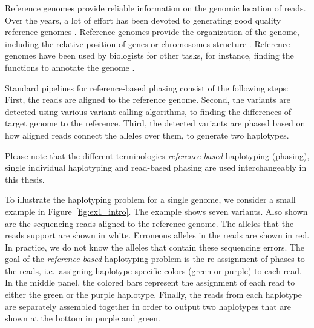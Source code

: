 Reference genomes provide reliable information on the genomic location of reads. 
Over the years, a lot of effort has been devoted to generating good quality reference genomes \citep{10002010map, international2005haplotype}.
 Reference genomes provide the organization of the genome,
including the relative position of genes or chromosomes structure \citep{encode2004encode}. 
Reference genomes have been used by biologists for other tasks, for instance, finding the functions to annotate the genome \citep{harrow2012gencode}.

Standard pipelines for reference-based phasing consist of the following steps: 
First, the reads are aligned to the reference genome. Second, the variants are detected using various variant calling algorithms, to finding the differences of target genome to the reference.
Third, the detected variants are phased based on how aligned reads connect the alleles over them, to generate two haplotypes.

Please note that the different terminologies \textit{reference-based} haplotyping (phasing), single individual haplotyping and read-based phasing are used interchangeably in this thesis.



 To illustrate the haplotyping problem for a single genome, we consider a small example in Figure~\ref{fig:ex1_intro}. The example shows seven variants. Also shown are the sequencing reads aligned to the reference genome.
 The alleles that the reads support are shown in white. 
 Erroneous alleles in the reads are shown in red. In practice, we do not know the alleles that contain these sequencing errors. 
 The goal of the \textit{reference-based} haplotyping problem is the re-assignment of phases to the reads, i.e.\, assigning haplotype-specific colors (green or purple) to each read. 
 In the middle panel, the colored bars represent the assignment of each read to either the green or the purple haplotype.
 Finally, the reads from each haplotype are separately assembled together in order to output two haplotypes that are shown at the bottom in purple and green.



